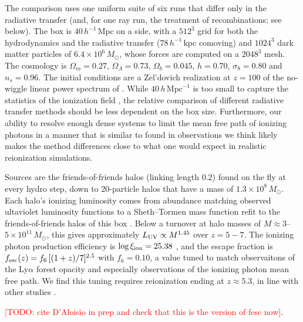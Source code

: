 \documentclass[iop]{openjournal}
\newcommand{\todo}[1]{\textcolor{red}{[TODO: #1]}}
\newcommand{\hmpc}{\,h\,\mathrm{Mpc}^{-1}}
\newcommand{\mpch}{\,h^{-1}\,\mathrm{Mpc}}
\begin{document}
The comparison uses one uniform suite of six runs that differ only in
the radiative transfer (and, for one ray run, the treatment of
recombinations; see below). The box is $40\mpch$ on a
side, with a $512^3$ grid for both the hydrodynamics and the radiative transfer ($78\,h^{-1}$\,kpc comoving) and $1024^3$ dark
matter particles of $6.4\times10^6\,M_\odot$, whose forces are computed on
a $2048^3$ mesh. The cosmology is $\Omega_m=0.27$,
$\Omega_\Lambda=0.73$, $\Omega_b=0.045$, $h=0.70$, $\sigma_8=0.80$ and
$n_s=0.96$. The initial conditions are a Zel'dovich realization at $z=100$
of the no-wiggle linear power spectrum of \citet{eisenstein98}.  While $40 \hmpc$ is too small to capture the statistics of the ionization field \citep{barkanaloeb??, furlanetto04}, the relative comparison of different radiative transfer methods should be less dependent on the box size.  Furthermore, our ability to resolve enough dense systems to limit the mean free path of ionizing photons in a manner that is similar to found in observations we think likely makes the method differences close to what one would expect in realistic reionization simulations.




Sources are the friends-of-friends halos (linking length 0.2) found on the
fly at every hydro step, down to 20-particle halos that have a mass of $1.3\times10^8\,M_\odot$. Each halo's ionizing luminosity comes from abundance
matching observed ultaviolet luminosity functions to a Sheth--Tormen mass function
refit to the friends-of-friends halos of this box
\citep{sheth99,bouwens21,bouwens22,donnan24,atek26}. Below a turnover at halo masses of
$M\approx3$--$5\times10^{11}\,M_\odot$, this gives approximately $L_{\rm UV}\propto M^{1.45}$ over $z=5-7$. The
ionizing photon production efficiency is
$\log\xi_{\rm ion}=25.38$ \citep{pahl25}, and the escape fraction is
$f_{\rm esc}(z)=f_6\,[(1+z)/7]^{2.5}$ with $f_6=0.10$, a value tuned to match observaitons of the Ly$\alpha$ forest opacity and especially observations of the ionizing photon mean free path.  We find this tuning requires reionization ending at $z\approx 5.3$, in line with other studies \citep{kulkarniorkeatingpapers}.

\todo{cite D'Aloisio in prep and check that this is the version of fesc now}.
\end{document}

